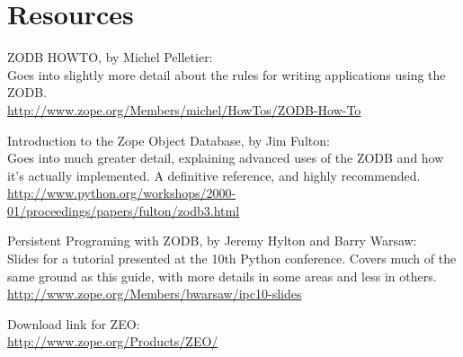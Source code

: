 
\section{Resources}

ZODB HOWTO, by Michel Pelletier:
\\
Goes into slightly more detail about the rules for writing applications using the ZODB.
\\
\url{http://www.zope.org/Members/michel/HowTos/ZODB-How-To}


Introduction to the Zope Object Database, by Jim Fulton:
\\
Goes into much greater detail, explaining advanced uses of the ZODB and 
how it's actually implemented.  A definitive reference, and highly recommended.
\\
\url{http://www.python.org/workshops/2000-01/proceedings/papers/fulton/zodb3.html}

Persistent Programing with ZODB, by Jeremy Hylton and Barry Warsaw:
\\
Slides for a tutorial presented at the 10th Python conference.  Covers
much of the same ground as this guide, with more details in some areas
and less in others.
\\
\url{http://www.zope.org/Members/bwarsaw/ipc10-slides}

Download link for ZEO: \\
\url{http://www.zope.org/Products/ZEO/}


